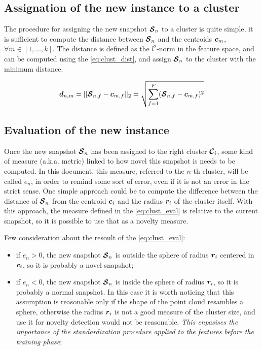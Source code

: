 \subsection{Assignation of the new instance to a cluster} 
The procedure for assigning the new snapshot $\bm{\mathcal{S}}_n$ to a cluster is quite simple, it is sufficient to compute the distance between $\bm{\mathcal{S}}_n$ and the centroids $\bm{c}_m$, $\forall m \in  [1, \dots , k]$. The distance is defined as the $l^2$-norm in the feature space, and can be computed using the \autoref{eq:clust_dist}, and assign $\bm{\mathcal{S}}_n$ to the cluster with the minimum distance.

\begin{equation}
  \label{eq:clust_dist}
  \bm{d}_{n,m} = ||\bm{\mathcal{S}}_{n,f} - \bm{c}_{m,f}||_2 = \sqrt{\sum_{f=1}^{F} (\bm{\mathcal{S}}_{n,f} - \bm{c}_{m,f})^2}
\end{equation}

\subsection{Evaluation of the new instance}
Once the new snapshot $\bm{\mathcal{S}}_n$ has been assigned to the right cluster $\bm{\mathcal{C}}_i$, some kind of measure (a.k.a. metric) linked to how novel this snapshot is needs to be computed. In this document, this measure, referred to the $n$-th cluster, will be called $e_n$, in order to remind some sort of error, even if it is not an error in the strict sense. One simple approach could be to compute the difference between the distance of $\bm{\mathcal{S}}_n$ from the centroid $\bm{c}_i$ and the radius $\bm{r}_i$ of the cluster itself. With this approach, the measure defined in the \autoref{eq:clust_eval} is relative to the current snapshot, so it is possible to use that as a novelty measure.

Few consideration about the resoult of the \autoref{eq:clust_eval}:
\begin{itemize}
  \item if $e_{n} > 0$, the new snapshot $\bm{\mathcal{S}}_n$ is outside the sphere of radius $\bm{r}_i$ centered in $\bm{c}_i$, so it is probably a novel snapshot;
  \item if $e_{n} < 0$, the new snapshot $\bm{\mathcal{S}}_n$ is inside the sphere of radius $\bm{r}_i$, so it is probably a normal snapshot. In this case it is worth noticing that this assumption is reasonable only if the shape of the point cloud resambles a sphere, otherwise the radius $\bm{r}_i$ is not a good measure of the cluster size, and use it for novelty detection would not be reasonable. \emph{This enpasises the importance of the standardization procedure applied to the features before the training phase};
\end{itemize}

